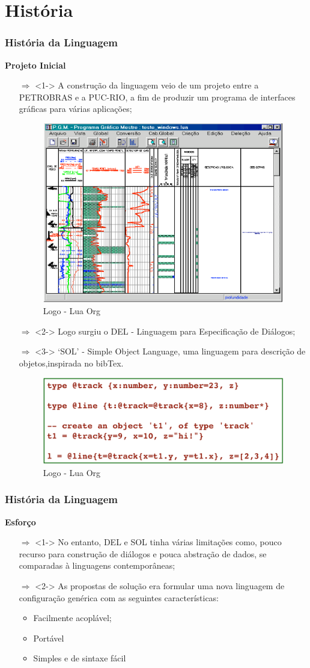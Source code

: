 ﻿\documentclass{beamer}
\begin{document}
\section{História}
\begin{frame}[fragile]
\frametitle{História da Linguagem}
{\bf Projeto Inicial}\vspace{0.2cm}
\begin{itemize}
\item[$\Rightarrow$]<1-> A construção da linguagem veio de um projeto entre a PETROBRAS e a PUC-RIO, a fim de produzir um programa de interfaces gráficas para várias aplicações;
\begin{figure}[!htb]
\centering
\includegraphics[width=0.3\linewidth]{imagens/imagem1}
\caption{Logo - Lua Org}
\end{figure}
\item[$\Rightarrow$]<2-> Logo surgiu o DEL - Linguagem para Especificação de Diálogos;
\item[$\Rightarrow$]<3-> ‘SOL’ - Simple Object Language, uma linguagem para descrição de objetos,inspirada no bibTex.
\begin{figure}[!htb]
\centering
\includegraphics[width=0.3\linewidth]{imagens/imagem2}
\caption{Logo - Lua Org}
\end{figure}
\end{itemize}
\end{frame}

\begin{frame}[fragile]
\frametitle{História da Linguagem}
{\bf Esforço}\vspace{0.2cm}
\begin{itemize}
\item[$\Rightarrow$]<1-> No entanto, DEL e SOL tinha várias limitações como, pouco recurso para construção de diálogos e pouca abstração de dados, se comparadas à linguagens contemporâneas;
\item[$\Rightarrow$]<2-> As propostas de solução era formular uma nova linguagem de configuração genérica com as seguintes características:
\begin{itemize}
\item<3-> Facilmente acoplável;
\item<4-> Portável
\item<5-> Simples e de sintaxe fácil
\end{itemize}
\end{itemize}
\end{frame}
\end{document}
